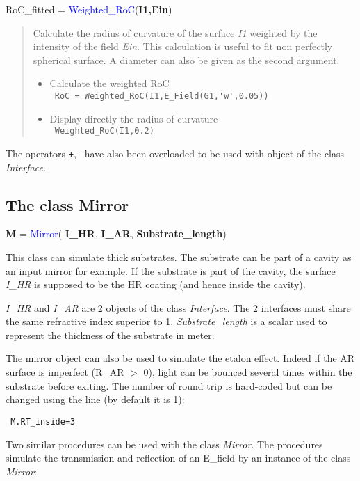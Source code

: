 \noindent RoC\_fitted = \textcolor{blue}{Weighted\_RoC}(\textbf{I1,Ein})
\vspace*{-0.2cm}
\begin{quote}
Calculate the radius of curvature of the surface \textsl{I1} weighted by the intensity of the field \textsl{Ein}. This calculation is useful to fit non perfectly spherical surface. A diameter can also be given as the second argument.
\begin{itemize}
  \item Calculate the weighted RoC \\
        \verb? RoC = Weighted_RoC(I1,E_Field(G1,'w',0.05)) ?
  \item Display directly the radius of curvature \\
        \verb? Weighted_RoC(I1,0.2) ?
\end{itemize}
\end{quote}

The operators \verb?+?,\verb?-? have also been overloaded to be used with object of the class \textit{Interface}.

\subsection{The class Mirror}
\textbf{M} = \textcolor{blue}{Mirror}( \textbf{I\_HR}, \textbf{I\_AR}, \textbf{Substrate\_length})

This class can simulate thick substrates. The substrate can be part of a cavity as an input mirror for example. If the substrate is part of the cavity, the surface \textsl{I\_HR} is supposed to be the HR coating (and hence inside the cavity).

\textsl{I\_HR} and \textsl{I\_AR} are 2 objects of the class \textsl{Interface}. The 2 interfaces must share the same refractive index superior to 1. \textsl{Substrate\_length} is a scalar used to represent the thickness of the substrate in meter.

The mirror object can also be used to simulate the etalon effect. Indeed if the AR surface is imperfect (R\_AR $>$ 0), light can be bounced several times within the substrate before exiting. The number of round trip is hard-coded but can be changed using the line (by default it is 1):

 \verb? M.RT_inside=3 ?

Two similar procedures can be used with the class \textsl{Mirror}. The procedures simulate the transmission and reflection of an E\_field by an instance of the class \textsl{Mirror}:

